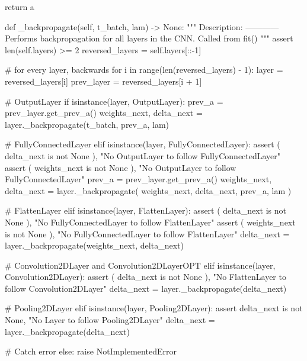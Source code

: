 \documentclass[%
oneside,                 %
final,                   %
10pt]{article}
\begin{document}
        return a

    def _backpropagate(self, t_batch, lam) -> None:
        """
        Description:
        ------------
            Performs backpropagation for all layers in the CNN. Called from fit()
        """
        assert len(self.layers) >= 2
        reversed_layers = self.layers[::-1]

        # for every layer, backwards
        for i in range(len(reversed_layers) - 1):
            layer = reversed_layers[i]
            prev_layer = reversed_layers[i + 1]

            # OutputLayer
            if isinstance(layer, OutputLayer):
                prev_a = prev_layer.get_prev_a()
                weights_next, delta_next = layer._backpropagate(t_batch, prev_a, lam)

            # FullyConnectedLayer
            elif isinstance(layer, FullyConnectedLayer):
                assert (
                    delta_next is not None
                ), "No OutputLayer to follow FullyConnectedLayer"
                assert (
                    weights_next is not None
                ), "No OutputLayer to follow FullyConnectedLayer"
                prev_a = prev_layer.get_prev_a()
                weights_next, delta_next = layer._backpropagate(
                    weights_next, delta_next, prev_a, lam
                )

            # FlattenLayer
            elif isinstance(layer, FlattenLayer):
                assert (
                    delta_next is not None
                ), "No FullyConnectedLayer to follow FlattenLayer"
                assert (
                    weights_next is not None
                ), "No FullyConnectedLayer to follow FlattenLayer"
                delta_next = layer._backpropagate(weights_next, delta_next)

            # Convolution2DLayer and Convolution2DLayerOPT
            elif isinstance(layer, Convolution2DLayer):
                assert (
                    delta_next is not None
                ), "No FlattenLayer to follow Convolution2DLayer"
                delta_next = layer._backpropagate(delta_next)

            # Pooling2DLayer
            elif isinstance(layer, Pooling2DLayer):
                assert delta_next is not None, "No Layer to follow Pooling2DLayer"
                delta_next = layer._backpropagate(delta_next)

            # Catch error
            else:
                raise NotImplementedError
\end{document}
